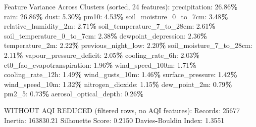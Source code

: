 \documentclass[
  letterpaper,
  DIV=11,
  numbers=noendperiod]{scrartcl}
\newenvironment{Shaded}{\begin{snugshade}}{\end{snugshade}}
\newcommand{\BuiltInTok}[1]{#1}
\newcommand{\DecValTok}[1]{\textcolor[rgb]{0.00,0.00,0.81}{#1}}
\newcommand{\FloatTok}[1]{\textcolor[rgb]{0.00,0.00,0.81}{#1}}
\newcommand{\NormalTok}[1]{#1}
\newcommand{\OperatorTok}[1]{\textcolor[rgb]{0.81,0.36,0.00}{\textbf{#1}}}
\begin{document}
\begin{Shaded}
\begin{Highlighting}[]
\NormalTok{  Feature Variance Across Clusters (}\BuiltInTok{sorted}\NormalTok{, }\DecValTok{24}\NormalTok{ features):}
\NormalTok{    precipitation: }\FloatTok{26.86}\OperatorTok{\%}
\NormalTok{    rain: }\FloatTok{26.86}\OperatorTok{\%}
\NormalTok{    dust: }\FloatTok{5.30}\OperatorTok{\%}
\NormalTok{    pm10: }\FloatTok{4.53}\OperatorTok{\%}
\NormalTok{    soil\_moisture\_0\_to\_7cm: }\FloatTok{3.48}\OperatorTok{\%}
\NormalTok{    relative\_humidity\_2m: }\FloatTok{2.71}\OperatorTok{\%}
\NormalTok{    soil\_temperature\_7\_to\_28cm: }\FloatTok{2.61}\OperatorTok{\%}
\NormalTok{    soil\_temperature\_0\_to\_7cm: }\FloatTok{2.38}\OperatorTok{\%}
\NormalTok{    dewpoint\_depression: }\FloatTok{2.36}\OperatorTok{\%}
\NormalTok{    temperature\_2m: }\FloatTok{2.22}\OperatorTok{\%}
\NormalTok{    previous\_night\_low: }\FloatTok{2.20}\OperatorTok{\%}
\NormalTok{    soil\_moisture\_7\_to\_28cm: }\FloatTok{2.11}\OperatorTok{\%}
\NormalTok{    vapour\_pressure\_deficit: }\FloatTok{2.05}\OperatorTok{\%}
\NormalTok{    cooling\_rate\_6h: }\FloatTok{2.03}\OperatorTok{\%}
\NormalTok{    et0\_fao\_evapotranspiration: }\FloatTok{1.96}\OperatorTok{\%}
\NormalTok{    wind\_speed\_100m: }\FloatTok{1.71}\OperatorTok{\%}
\NormalTok{    cooling\_rate\_12h: }\FloatTok{1.49}\OperatorTok{\%}
\NormalTok{    wind\_gusts\_10m: }\FloatTok{1.46}\OperatorTok{\%}
\NormalTok{    surface\_pressure: }\FloatTok{1.42}\OperatorTok{\%}
\NormalTok{    wind\_speed\_10m: }\FloatTok{1.32}\OperatorTok{\%}
\NormalTok{    nitrogen\_dioxide: }\FloatTok{1.15}\OperatorTok{\%}
\NormalTok{    dew\_point\_2m: }\FloatTok{0.79}\OperatorTok{\%}
\NormalTok{    pm2\_5: }\FloatTok{0.73}\OperatorTok{\%}
\NormalTok{    aerosol\_optical\_depth: }\FloatTok{0.26}\OperatorTok{\%}

\NormalTok{WITHOUT AQI REDUCED (filtered rows, no AQI features):}
\NormalTok{  Records: }\DecValTok{25677}
\NormalTok{  Inertia: }\FloatTok{163830.21}
\NormalTok{  Silhouette Score: }\FloatTok{0.2150}
\NormalTok{  Davies}\OperatorTok{{-}}\NormalTok{Bouldin Index: }\FloatTok{1.3551}


\end{Highlighting}
\end{Shaded}
\end{document}

